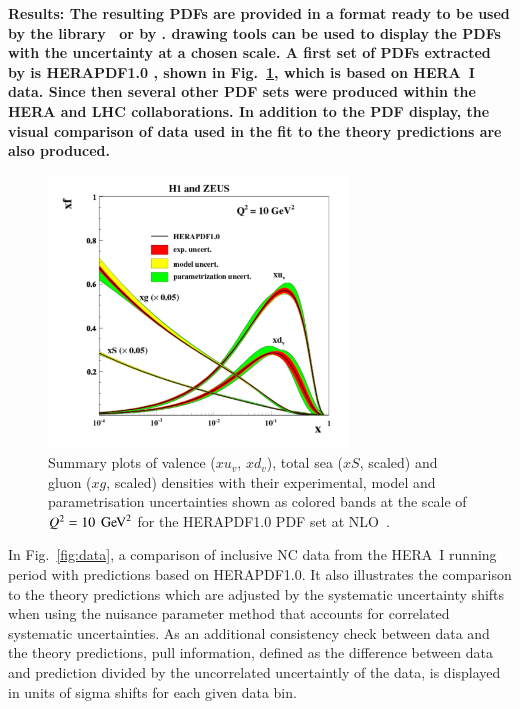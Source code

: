 \begin{description}
%
\item
\bf{Results:} \rm 
The resulting PDFs are provided in a format ready to be used by the \lhapdf 
library~\cite{lhapdf,lhapdfweb} or by \tmdlib \cite{tmdlref}.
\fitter drawing tools can be used to display the PDFs with the uncertainty at a chosen scale.  
A first set of PDFs extracted by \fitter is HERAPDF1.0 \cite{h1zeus:2009wt}, shown in Fig.~\ref{fig:hera1}, 
which is based on HERA~I data.
Since then several other PDF sets were produced within the HERA and LHC collaborations.
In addition to the PDF display, 
the visual comparison of data used in the fit to the theory predictions are also produced. 
\begin{figure}[!ht]
   \centering
   \includegraphics[width=8cm]{hera1.pdf}
   \caption{Summary plots of valence ($xu_v$, $xd_v$), total sea ($xS$, scaled) and gluon ($xg$, scaled) densities
   with their experimental, model and parametrisation uncertainties shown as colored bands at the scale 
   of $Q^2=10 \ \,\text{Ge\hspace{-.08em}V}^2$ for the HERAPDF1.0 PDF set at NLO~\cite{h1zeus:2009wt}.}
 \label{fig:hera1}
\end{figure}
In Fig.~\ref{fig:data}, a comparison of inclusive NC data from the HERA~I running period with predictions based on HERAPDF1.0. It also illustrates the comparison to the theory predictions which are adjusted by the  
systematic uncertainty shifts when using the nuisance parameter method that accounts for 
correlated systematic uncertainties. 
As an additional consistency check between data and the theory predictions, pull information, defined as the difference between data and prediction divided by the uncorrelated uncertaintly of the data, is displayed in units of sigma shifts for each given data bin.


\end{description}
